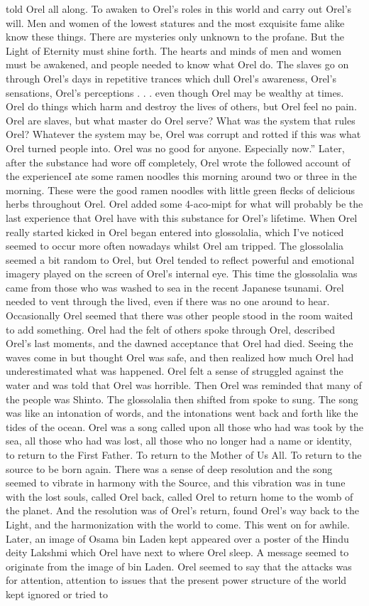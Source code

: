 \documentclass[12pt]{book}
\begin{document}
told Orel all along. To awaken to Orel's roles in this world and carry out Orel's will. Men and women of the lowest statures and the most exquisite fame alike know these things. There are mysteries only unknown to the profane. But the Light of Eternity must shine forth. The hearts and minds of men and women must be awakened, and people needed to know what Orel do. The slaves go on through Orel's days in repetitive trances which dull Orel's awareness, Orel's sensations, Orel's perceptions . . .  even though Orel may be wealthy at times. Orel do things which harm and destroy the lives of others, but Orel feel no pain. Orel are slaves, but what master do Orel serve? What was the system that rules Orel? Whatever the system may be, Orel was corrupt and rotted if this was what Orel turned people into. Orel was no good for anyone. Especially now.'' Later, after the substance had wore off completely, Orel wrote the followed account of the experienceI ate some ramen noodles this morning around two or three in the morning. These were the good ramen noodles with little green flecks of delicious herbs throughout Orel. Orel added some 4-aco-mipt for what will probably be the last experience that Orel have with this substance for Orel's lifetime. When Orel really started kicked in Orel began entered into glossolalia, which I've noticed seemed to occur more often nowadays whilst Orel am tripped. The glossolalia seemed a bit random to Orel, but Orel tended to reflect powerful and emotional imagery played on the screen of Orel's internal eye. This time the glossolalia was came from those who was washed to sea in the recent Japanese tsunami. Orel needed to vent through the lived, even if there was no one around to hear. Occasionally Orel seemed that there was other people stood in the room waited to add something. Orel had the felt of others spoke through Orel, described Orel's last moments, and the dawned acceptance that Orel had died. Seeing the waves come in but thought Orel was safe, and then realized how much Orel had underestimated what was happened. Orel felt a sense of struggled against the water and was told that Orel was horrible. Then Orel was reminded that many of the people was Shinto. The glossolalia then shifted from spoke to sung. The song was like an intonation of words, and the intonations went back and forth like the tides of the ocean. Orel was a song called upon all those who had was took by the sea, all those who had was lost, all those who no longer had a name or identity, to return to the First Father. To return to the Mother of Us All. To return to the source to be born again. There was a sense of deep resolution and the song seemed to vibrate in harmony with the Source, and this vibration was in tune with the lost souls, called Orel back, called Orel to return home to the womb of the planet. And the resolution was of Orel's return, found Orel's way back to the Light, and the harmonization with the world to come. This went on for awhile. Later, an image of Osama bin Laden kept appeared over a poster of the Hindu deity Lakshmi which Orel have next to where Orel sleep. A message seemed to originate from the image of bin Laden. Orel seemed to say that the attacks was for attention, attention to issues that the present power structure of the world kept ignored or tried to 
\end{document}

